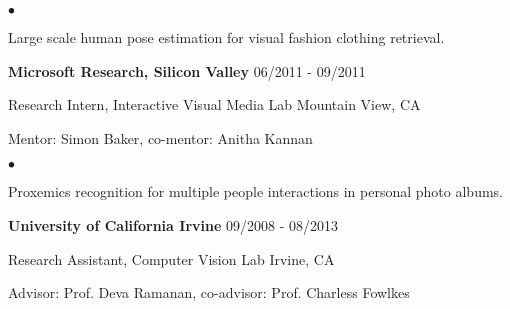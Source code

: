 \documentclass[margin]{res3}
\newenvironment{list1}{
  \begin{list}{\ding{113}}{%
      \setlength{\itemsep}{0.03in}
      \setlength{\parsep}{0in} \setlength{\parskip}{0in}
      \setlength{\topsep}{0in} \setlength{\partopsep}{0in}
      \setlength{\leftmargin}{0in}}}{\end{list}}
\newenvironment{list2}{
  \begin{list}{$\bullet$}{%
      \setlength{\itemsep}{0.02in}
      \setlength{\parsep}{0in} \setlength{\parskip}{0in}
      \setlength{\topsep}{0in} \setlength{\partopsep}{0in}
      \setlength{\leftmargin}{0.2in}}}{\end{list}}
\begin{document}
\begin{resume}
\begin{list1}
\begin{list2}
\item Large scale human pose estimation for visual fashion clothing retrieval.	
\end{list2}
\vspace{5pt}


\item[] {\bf Microsoft Research, Silicon Valley} \hfill {06/2011 - 09/2011}
\vspace{-2pt}
\item[] Research Intern, Interactive Visual Media Lab \hfill{Mountain View, CA}
\vspace{-2pt}
\item[] Mentor: Simon Baker, co-mentor: Anitha Kannan

\begin{list2}
\item Proxemics recognition for multiple people interactions in personal photo albums.
\end{list2}
\vspace{5pt}


\item[] {\bf University of California Irvine} \hfill {09/2008 - 08/2013}
\vspace{-2pt}
\item[] Research Assistant, Computer Vision Lab \hfill {Irvine, CA}
\vspace{-2pt}
\item[] Advisor: Prof. Deva Ramanan, co-advisor: Prof. Charless Fowlkes


\end{list1}
\end{resume}
\end{document}
